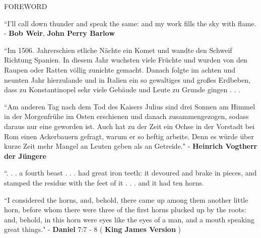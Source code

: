 \documentclass[11pt]{article}
\begin{document}
\vspace*{0.01\baselineskip}

\begingroup
\begin{center}
\huge FOREWORD
\end{center}
\endgroup

\begingroup
\begin{center}
``I'll call down thunder and speak the same: and my work fills the sky with flame.
\rightskip\leftskip
\phantom{text} \hfill - \textbf{Bob Weir}, \textbf{John Perry Barlow}
\end{center}
\endgroup

\vspace*{0.1\baselineskip}

\begingroup
\begin{center}
``Im 1506. Jahrerschien etliche Nächte ein Komet und wandte den Schweif Richtung Spanien. In diesem Jahr wuchsten viele Früchte und wurden von den Raupen oder Ratten völlig zunichte gemacht. Danach folgte im achten und neunten Jahr hierzulande und in Italien ein so gewaltiges und großes Erdbeben, dass zu Konstantinopel sehr viele Gebäude und Leute zu Grunde gingen . . . 
\rightskip\leftskip
\phantom{text} \hfill \textcolor{white}{fuck}
\end{center}
\endgroup

\begingroup
\begin{center}
``Am anderen Tag nach dem Tod des Kaisers Julius sind drei Sonnen am Himmel in der Morgenfrühe im Osten erschienen und danach zusammengezogen, sodass daraus nur eine geworden ist. Auch hat zu der Zeit ein Ochse in der Vorstadt bei Rom einen Ackerbauern gefragt, warum er so heftig arbeite. Denn es würde über kurze Zeit mehr Mangel an Leuten geben als an Getreide."
\rightskip\leftskip
\phantom{text} \hfill - \textbf{Heinrich Vogtherr der Jüngere}
\end{center}
\endgroup

\vspace*{0.1\baselineskip}

\begingroup
\begin{center}
``. . . a fourth beast . . . had great iron teeth: it devoured and brake in pieces, and stamped the residue with the feet of it . . . and it had ten horns.
\rightskip\leftskip
\phantom{text} \hfill \textcolor{white}{fuck}
\end{center}
\endgroup

\begingroup
\begin{center}
``I considered the horns, and, behold, there came up among them another little horn, before whom there were three of the first horns plucked up by the roots: and, behold, in this horn were eyes like the eyes of a man, and a mouth speaking great things."
\rightskip\leftskip
\phantom{text} \hfill - \textbf{Daniel} 7:7 - 8 ( \textbf{King James Version} )
\end{center}
\endgroup
\end{document}
